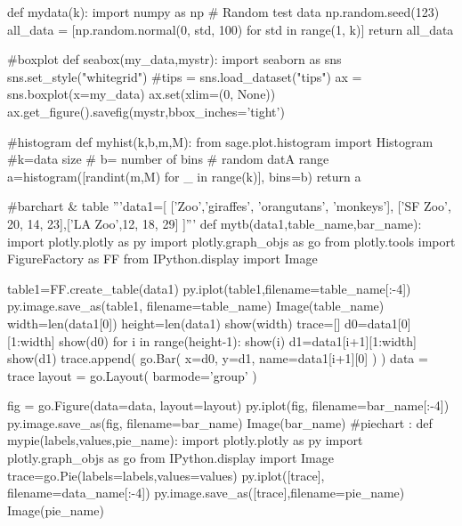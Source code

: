 \begin{sagesilent}
def mydata(k):
    import numpy as np
    # Random test data
    np.random.seed(123)
    all_data = [np.random.normal(0, std, 100) for std in range(1, k)]
    return all_data

#boxplot
def seabox(my_data,mystr):
    import seaborn as sns
    sns.set_style("whitegrid")
    #tips = sns.load_dataset("tips")
    ax = sns.boxplot(x=my_data)
    ax.set(xlim=(0, None))    
    ax.get_figure().savefig(mystr,bbox_inches='tight')

#histogram
def myhist(k,b,m,M):
    from sage.plot.histogram import Histogram
    #k=data size
    # b= number of bins
    # random datA range
    a=histogram([randint(m,M) for _ in range(k)], bins=b)
    return a

#barchart & table
'''data1=[
['Zoo','giraffes', 'orangutans', 'monkeys'], ['SF Zoo', 20, 14, 23],['LA Zoo',12, 18, 29]
]'''
def mytb(data1,table_name,bar_name):
    import plotly.plotly as py
    import plotly.graph_objs as go
    from plotly.tools import FigureFactory as FF 
    from IPython.display import Image

    table1=FF.create_table(data1)
    py.iplot(table1,filename=table_name[:-4])
    py.image.save_as(table1, filename=table_name)
    Image(table_name)
    width=len(data1[0])
    height=len(data1)
    show(width)
    trace=[]
    d0=data1[0][1:width]
    show(d0)
    for i in range(height-1):
        show(i)
        d1=data1[i+1][1:width]
        show(d1)
        trace.append(
            go.Bar(
            x=d0,
            y=d1,
            name=data1[i+1][0]
                   )
                     )
    data = trace
    layout = go.Layout(
        barmode='group'
    )

    fig = go.Figure(data=data, layout=layout)
    py.iplot(fig, filename=bar_name[:-4])
    py.image.save_as(fig, filename=bar_name)
    Image(bar_name)
#piechart :
def mypie(labels,values,pie_name):
    import plotly.plotly as py
    import plotly.graph_objs as go
    from IPython.display import Image
    trace=go.Pie(labels=labels,values=values)
    py.iplot([trace], filename=data_name[:-4])
    py.image.save_as([trace],filename=pie_name)
    Image(pie_name)
    
\end{sagesilent}


